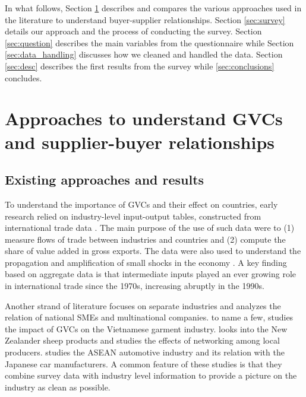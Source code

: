 \usepackage{}\documentclass[final, dvipsnames, authoryear,12pt]{elsarticle}
\begin{document}
In what follows, Section \ref{sec: approach} describes and compares the various approaches used in the literature to understand buyer-supplier relationships. Section \ref{sec:survey} details our approach and the process of conducting the survey. Section \ref{sec:question} describes the main variables from the questionnaire while Section \ref{sec:data_handling} discusses how we cleaned and handled the data. Section \ref{sec:desc} describes the first results from the survey while \ref{sec:conclusions} concludes.  

\section{Approaches to understand GVCs and supplier-buyer relationships} 
\label{sec: approach}

\subsection{Existing approaches and results}

To understand the importance of GVCs and their effect on countries, early research relied on industry-level input-output tables, constructed from international trade data \citep{johnson2012accounting, hummels2001nature}. The main purpose of the use of such data were to (1) measure flows of trade between industries and countries and (2) compute the share of value added in gross exports. The data were also used to understand the propagation and amplification of small shocks in the economy \citep{acemoglu2016networks}. A key finding based on aggregate data is that intermediate inputs played an ever growing role in international trade since the 1970s, increasing abruptly in the 1990s. 

Another strand of literature focuses on separate industries and analyzes the relation of national SMEs and multinational companies. to name a few, \citep{nadvi2004vietnam} studies the impact of GVCs on the Vietnamese garment industry. \citep{heron2001global} looks into the New Zealander sheep products and studies the effects of networking among local producers. \cite{arfani1production} studies the ASEAN automotive industry and its relation with the Japanese car manufacturers. A common feature of these studies is that they combine survey data with industry level information to provide a picture on the industry as clean as possible.  
\end{document}
